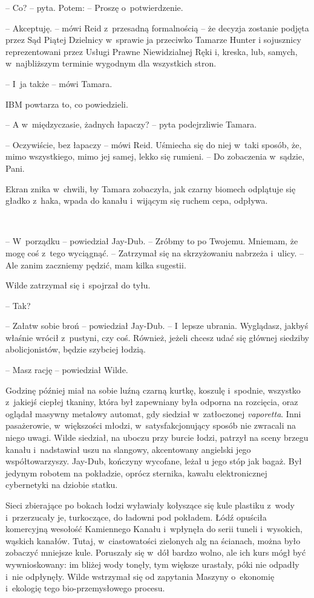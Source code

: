 \documentclass[oneside,polish,11pt,sfheadings]{mwbk}
\let\footnote=\endnote
\begin{document}
-- Co? -- pyta. Potem: -- Proszę o~potwierdzenie.

-- Akceptuję. -- mówi Reid z~przesadną formalnością -- że decyzja zostanie
podjęta przez Sąd Piątej Dzielnicy w~sprawie ja przeciwko Tamarze Hunter
i sojusznicy reprezentowani przez Usługi Prawne Niewidzialnej Ręki i,
kreska, lub, samych, w~najbliższym terminie wygodnym dla wszystkich
stron.

-- I~ja także -- mówi Tamara.

IBM powtarza to, co powiedzieli.

-- A w~międzyczasie, żadnych łapaczy? -- pyta podejrzliwie Tamara.

-- Oczywiście, bez łapaczy -- mówi Reid. Uśmiecha się do niej w~taki
sposób, że, mimo wszystkiego, mimo jej samej, lekko się rumieni. -- Do
zobaczenia w~sądzie, Pani.

Ekran znika w~chwili, by Tamara zobaczyła, jak czarny biomech odplątuje
się gładko z~haka, wpada do kanału i~wijącym się ruchem cepa, odpływa.

~

-- W~porządku -- powiedział Jay-Dub. -- Zróbmy to po Twojemu. Mniemam, że
mogę coś z~tego wyciągnąć. -- Zatrzymał się na skrzyżowaniu nabrzeża i~ulicy. -- Ale zanim zaczniemy pędzić, mam kilka sugestii.

Wilde zatrzymał się i~spojrzał do tyłu. 

-- Tak?

-- Załatw sobie broń -- powiedział Jay-Dub. -- I~lepsze ubrania. Wyglądasz,
jakbyś właśnie wrócił z~pustyni, czy coś. Również, jeżeli chcesz udać
się głównej siedziby abolicjonistów, będzie szybciej łodzią.

-- Masz rację -- powiedział Wilde.

Godzinę później miał na sobie luźną czarną kurtkę, koszulę i~spodnie,
wszystko z~jakiejś ciepłej tkaniny, która był zapewniany była odporna na
rozcięcia, oraz oglądał masywny metalowy automat, gdy siedział w~zatłoczonej \emph{vaporetta}\footnote{wenecka łódź, wodny autobus -- przyp.tłum.}. Inni pasażerowie, w~większości młodzi, w~satysfakcjonujący sposób nie zwracali na niego uwagi. Wilde siedział, na
uboczu przy burcie łodzi, patrzył na sceny brzegu kanału i~nadstawiał
uszu na slangowy, akcentowany angielski jego współtowarzyszy. Jay-Dub,
kończyny wycofane, leżał u jego stóp jak bagaż. Był jedynym robotem na
pokładzie, oprócz sternika, kawału elektronicznej cybernetyki na dziobie
statku.

Sieci zbierające po bokach łodzi wyławiały kołyszące się kule plastiku z~wody i~przerzucały je, turkoczące, do ładowni pod pokładem. Łódź
opuściła komercyjną wesołość Kamiennego Kanału i~wpłynęła do serii
tuneli i~wysokich, wąskich kanałów. Tutaj, w~ciastowatości zielonych alg
na ścianach, można było zobaczyć mniejsze kule. Poruszały się w~dół
bardzo wolno, ale ich kurs mógł być wywnioskowany: im bliżej wody
tonęły, tym większe urastały, póki nie odpadły i~nie odpłynęły. Wilde
wstrzymał się od zapytania Maszyny o~ekonomię i~ekologię tego
bio-przemysłowego procesu.
\end{document}
